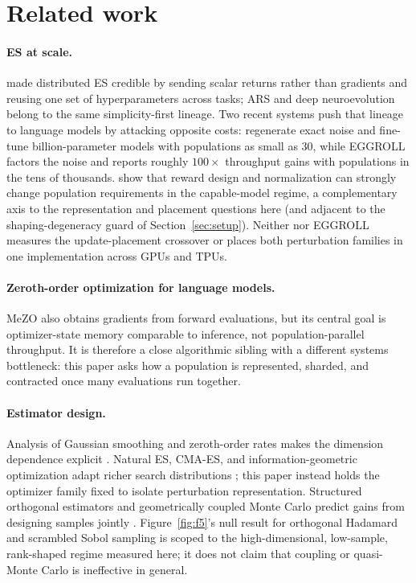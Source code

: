 \section{Related work}
\label{sec:related}

\paragraph{ES at scale.} \citet{salimans2017} made distributed ES credible by
sending scalar returns rather than gradients and reusing one set of
hyperparameters across tasks; ARS \citep{mania2018} and deep neuroevolution
\citep{such2017,conti2017,chrabaszcz2018} belong to the same
simplicity-first lineage. Two recent systems push that lineage to language
models by attacking opposite costs: \citet{qiu2025} regenerate exact noise and
fine-tune billion-parameter models with populations as small as 30, while
EGGROLL \citep{eggroll2025} factors the noise and reports roughly
$100\times$ throughput gains with populations in the tens of thousands.
\citet{cho2026reward} show that reward design and normalization can strongly
change population requirements in the capable-model regime, a complementary
axis to the representation and placement questions here
(and adjacent to the shaping-degeneracy guard of
Section~\ref{sec:setup}).
Neither \citet{qiu2025} nor EGGROLL measures the update-placement crossover
or places both perturbation families in one implementation across GPUs and
TPUs.

\paragraph{Zeroth-order optimization for language models.} MeZO
\citep{malladi2023} also obtains gradients from forward evaluations, but its
central goal is optimizer-state memory comparable to inference, not
population-parallel throughput. It is therefore a close algorithmic sibling
with a different systems bottleneck: this paper asks how a population is
represented, sharded, and contracted once many evaluations run together.

\paragraph{Estimator design.} Analysis of Gaussian smoothing and zeroth-order
rates makes the dimension dependence explicit
\citep{nesterov2017,duchi2015,berahas2022}. Natural ES, CMA-ES, and
information-geometric optimization adapt richer search distributions
\citep{wierstra2014,hansen2001,hansen2016,ollivier2017}; this paper instead
holds the optimizer family fixed to isolate perturbation representation.
Structured orthogonal estimators and geometrically coupled Monte Carlo
predict gains from designing samples jointly
\citep{choromanski2018structured,rowland2018coupled}. Figure~\ref{fig:f5}'s
null result for orthogonal Hadamard and scrambled Sobol sampling is scoped to
the high-dimensional, low-sample, rank-shaped regime measured here; it does
not claim that coupling or quasi-Monte Carlo is ineffective in general.

